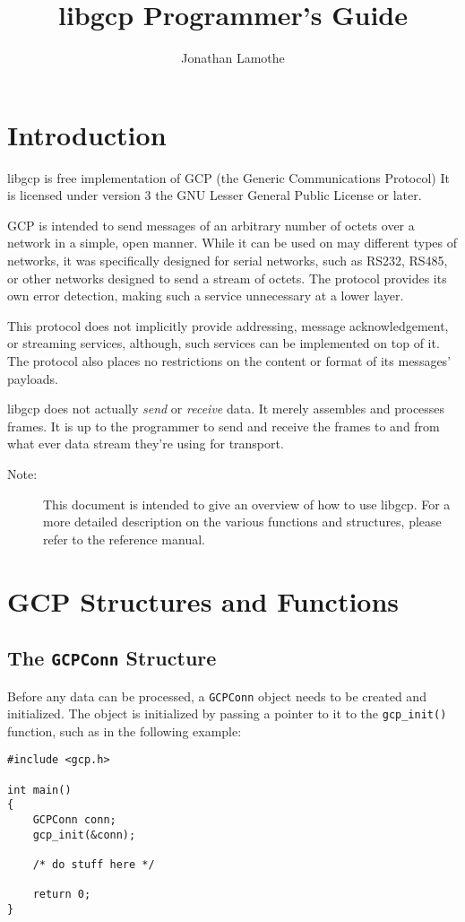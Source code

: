 \documentclass{article}
\title{libgcp Programmer's Guide}
\author{Jonathan Lamothe}
\begin{document}
\maketitle
\tableofcontents
\clearpage

\section{Introduction}
libgcp is free implementation of GCP (the Generic Communications
Protocol) It is licensed under version 3 the GNU Lesser General Public
License or later.

GCP is intended to send messages of an arbitrary number of octets over
a network in a simple, open manner.  While it can be used on may
different types of networks, it was specifically designed for serial
networks, such as RS232, RS485, or other networks designed to send a
stream of octets.  The protocol provides its own error detection,
making such a service unnecessary at a lower layer.

This protocol does not implicitly provide addressing, message
acknowledgement, or streaming services, although, such services can be
implemented on top of it.  The protocol also places no restrictions on
the content or format of its messages' payloads.

libgcp does not actually \emph{send} or \emph{receive} data.  It
merely assembles and processes frames.  It is up to the programmer to
send and receive the frames to and from what ever data stream they're
using for transport.

\begin{description}
\item[Note:]This document is intended to give an overview of how to
  use libgcp.  For a more detailed description on the various
  functions and structures, please refer to the reference manual.
\end{description}

\section{GCP Structures and Functions}

\subsection{The \texttt{GCPConn} Structure}
Before any data can be processed, a \texttt{GCPConn} object needs to
be created and initialized.  The object is initialized by passing a
pointer to it to the \texttt{gcp\_init()} function, such as in the
following example:
\begin{verbatim}
#include <gcp.h>

int main()
{
    GCPConn conn;
    gcp_init(&conn);

    /* do stuff here */

    return 0;
}
\end{verbatim}
\end{document}
